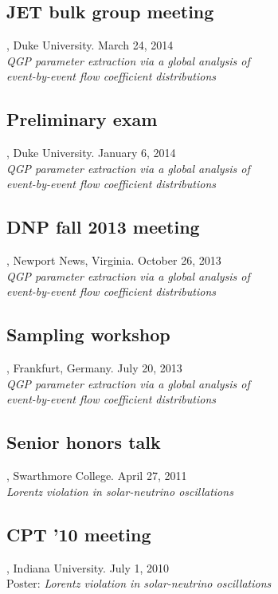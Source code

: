 \documentclass[letterpaper,10pt]{article}
\begin{document}
\subsection{JET bulk group meeting}, Duke University. \hfill March 24, 2014 \\
\emph{QGP parameter extraction via a global analysis of \\ event-by-event flow coefficient distributions}


\subsection{Preliminary exam}, Duke University. \hfill January 6, 2014 \\
\emph{QGP parameter extraction via a global analysis of \\ event-by-event flow coefficient distributions}


\subsection{DNP fall 2013 meeting}, Newport News, Virginia. \hfill October 26, 2013 \\
\emph{QGP parameter extraction via a global analysis of \\ event-by-event flow coefficient distributions}


\subsection{Sampling workshop}, Frankfurt, Germany. \hfill July 20, 2013 \\
\emph{QGP parameter extraction via a global analysis of \\ event-by-event flow coefficient distributions}


\subsection{Senior honors talk}, Swarthmore College. \hfill April 27, 2011 \\
\emph{Lorentz violation in solar-neutrino oscillations}


\subsection{CPT '10 meeting}, Indiana University. \hfill July 1, 2010 \\
Poster: \emph{Lorentz violation in solar-neutrino oscillations}
\end{document}
